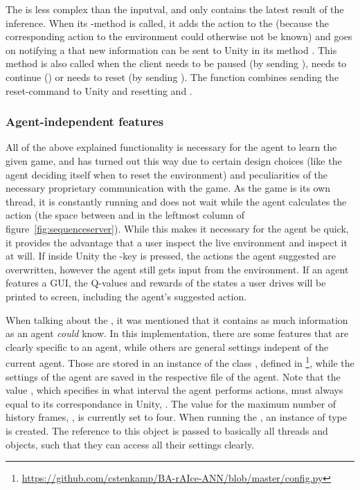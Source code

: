 The  is less complex than the inputval, and only contains the latest result of the inference. When its -method is called, it adds the action to the  (because the corresponding action to the environment could otherwise not be known) and goes on notifying a  that new information can be sent to Unity in its method . This method is also called when the client needs to be paused (by sending ), needs to continue () or needs to reset (by sending ). The function  combines sending the reset-command to Unity and resetting  and .

\subsubsection{Agent-independent features}

All of the above explained functionality is necessary for the agent to learn the given game, and has turned out this way due to certain design choices (like the agent deciding itself when to reset the environment) and peculiarities of the necessary proprietary communication with the game. As the game is its own thread, it is constantly running and does not wait while the agent calculates the action (the space between  and  in the leftmost column of figure~\ref{fig:sequenceserver}). While this makes it necessary for the agent be quick, it provides the advantage that a user inspect the live environment and inspect it at will. If inside Unity the -key is pressed, the actions the agent suggested are overwritten, however the agent still gets input from the environment. If an agent features a GUI, the Q-values and rewards of the states a user drives will be printed to screen, including the agent's suggested action.

When talking about the , it was mentioned that it contains as much information as an agent \textit{could} know. In this implementation, there are some features that are clearly specific to an agent, while others are general settings indepent of the current agent. Those are stored in an instance of the class , defined in \footnote{\url{https://github.com/cstenkamp/BA-rAIce-ANN/blob/master/config.py}}, while the settings of the agent are saved in the respective file of the agent. Note that the value , which specifies in what interval the agent performs actions, must always equal to its correspondance in Unity, . The value for the maximum number of history frames, , is currently set to four. When running the , an instance  of type  is created. The reference to this object is passed to basically all threads and objects, such that they can access all their settings clearly.


